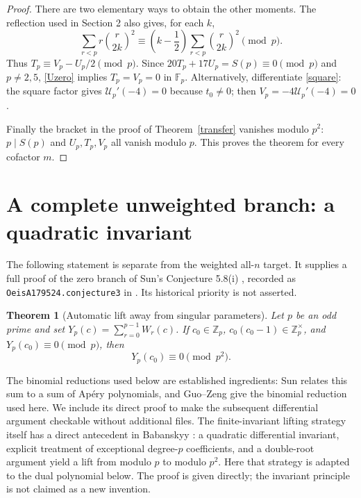 \documentclass[11pt,a4paper]{article}
\newtheorem{theorem}{Theorem}[section]
\theoremstyle{remark}\newtheorem{remark}[theorem]{Remark}
\newcommand{\Z}{\mathbb Z}
\newcommand{\F}{\mathbb F}
\begin{document}
\begin{proof}
There are two elementary ways to obtain the other moments.
The reflection used in Section 2 also gives, for each \(k\),
\[
 \sum_{r<p}r\binom r{2k}^2
 \equiv\left(k-\frac12\right)\sum_{r<p}\binom r{2k}^2\pmod p.
\]
Thus \(T_p\equiv V_p-U_p/2\pmod p\).
Since \(20T_p+17U_p=S(p)\equiv0\pmod p\) and \(p\ne2,5\),
\eqref{Uzero} implies \(T_p=V_p=0\) in \(\F_p\).
Alternatively, differentiate \eqref{square}: the square factor gives
\(\mathcal U_p'(-4)=0\) because \(t_0\ne0\); then
\(V_p=-4\mathcal U_p'(-4)=0\).

Finally the bracket in the proof of Theorem~\ref{transfer} vanishes
modulo \(p^2\): \(p\mid S(p)\) and \(U_p,T_p,V_p\) all vanish modulo \(p\).
This proves the theorem for every cofactor \(m\).
\end{proof}

\section{A complete unweighted branch: a quadratic invariant}\label{zeroliftsec}

The following statement is separate from the weighted all-\(n\) target.
It supplies a full proof of the zero branch of Sun's Conjecture 5.8(i)
\cite{Sun2010}, recorded as \texttt{OeisA179524.conjecture3} in
\cite{Formal}. Its historical priority is not asserted.

\begin{theorem}[Automatic lift away from singular parameters]\label{zerolift}
Let \(p\) be an odd prime and set
\(Y_p(c)=\sum_{r=0}^{p-1}W_r(c)\). If \(c_0\in\Z_p\),
\(c_0(c_0-1)\in\Z_p^\times\), and \(Y_p(c_0)\equiv0\pmod p\), then
\[
                         Y_p(c_0)\equiv0\pmod {p^2}.
\]
\end{theorem}

The binomial reductions used below are established ingredients:
Sun \cite[Theorem 1.1]{SunApery} relates this sum to a sum of Ap\'ery
polynomials, and Guo--Zeng \cite[Theorem 1.3]{GuoZeng} give the
binomial reduction used here. We include its direct proof to make the
subsequent differential argument checkable without additional files.
The finite-invariant lifting strategy itself has a direct antecedent in
Babanskyy \cite[Lemmas 2.1--2.2]{Babanskyy}: a quadratic differential
invariant, explicit treatment of exceptional degree-\(p\) coefficients,
and a double-root argument yield a lift from modulo \(p\) to modulo
\(p^2\). Here that strategy is adapted to the dual polynomial below.
The proof is given directly; the invariant principle is not claimed
as a new invention.
\end{document}
